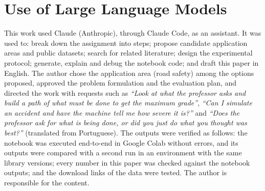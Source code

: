 \documentclass[12pt]{article}
\begin{document}
\section*{Use of Large Language Models}

This work used Claude (Anthropic), through Claude Code, as an assistant. It was
used to: break down the assignment into steps; propose candidate application
areas and public datasets; search for related literature; design the
experimental protocol; generate, explain and debug the notebook code; and draft
this paper in English. The author chose the application area (road safety)
among the options proposed, approved the problem formulation and the
evaluation plan, and directed the work with requests such as \emph{``Look at
what the professor asks and build a path of what must be done to get the
maximum grade''}, \emph{``Can I simulate an accident and have the machine tell
me how severe it is?''} and \emph{``Does the professor ask for what is being
done, or did you just do what you thought was best?''} (translated from
Portuguese). The outputs were verified as follows: the notebook was executed
end-to-end in Google Colab without errors, and its outputs were compared with
a second run in an environment with the same library versions; every number in
this paper was checked against the notebook outputs; and the download links of
the data were tested.
The author is responsible for the content.



\end{document}
